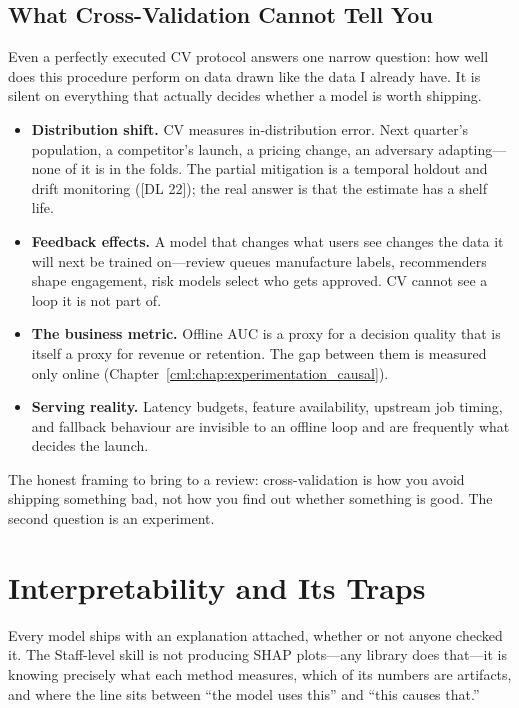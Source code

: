 \subsection{What Cross-Validation Cannot Tell You}

Even a perfectly executed CV protocol answers one narrow question: how well does this procedure perform on data drawn like the data I already have. It is silent on everything that actually decides whether a model is worth shipping.

\begin{itemize}
    \item \textbf{Distribution shift.} CV measures in-distribution error. Next quarter's population, a competitor's launch, a pricing change, an adversary adapting---none of it is in the folds. The partial mitigation is a temporal holdout and drift monitoring ([DL 22]); the real answer is that the estimate has a shelf life.
    \item \textbf{Feedback effects.} A model that changes what users see changes the data it will next be trained on---review queues manufacture labels, recommenders shape engagement, risk models select who gets approved. CV cannot see a loop it is not part of.
    \item \textbf{The business metric.} Offline AUC is a proxy for a decision quality that is itself a proxy for revenue or retention. The gap between them is measured only online (Chapter~\ref{cml:chap:experimentation_causal}).
    \item \textbf{Serving reality.} Latency budgets, feature availability, upstream job timing, and fallback behaviour are invisible to an offline loop and are frequently what decides the launch.
\end{itemize}

The honest framing to bring to a review: cross-validation is how you avoid shipping something bad, not how you find out whether something is good. The second question is an experiment.

\section{Interpretability and Its Traps}
\label{cml:sec:interpretability}

Every model ships with an explanation attached, whether or not anyone checked it. The Staff-level skill is not producing SHAP plots---any library does that---it is knowing precisely what each method measures, which of its numbers are artifacts, and where the line sits between ``the model uses this'' and ``this causes that.''

